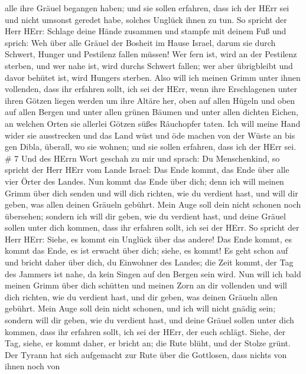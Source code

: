 alle ihre Gräuel begangen haben;  und sie sollen erfahren,
dass ich der HErr sei und nicht umsonst geredet habe, solches Unglück
ihnen zu tun.  So spricht der Herr HErr: Schlage deine
Hände zusammen und stampfe mit deinem Fuß und sprich: Weh über alle
Gräuel der Bosheit im Hause Israel, darum sie durch Schwert, Hunger und
Pestilenz fallen müssen!  Wer fern ist, wird an der
Pestilenz sterben, und wer nahe ist, wird durchs Schwert fallen; wer
aber übrigbleibt und davor behütet ist, wird Hungers sterben. Also will
ich meinen Grimm unter ihnen vollenden,  dass ihr erfahren
sollt, ich sei der HErr, wenn ihre Erschlagenen unter ihren Götzen
liegen werden um ihre Altäre her, oben auf allen Hügeln und oben auf
allen Bergen und unter allen grünen Bäumen und unter allen dichten
Eichen, an welchen Orten sie allerlei Götzen süßes Räuchopfer taten.
 Ich will meine Hand wider sie ausstrecken und das Land
wüst und öde machen von der Wüste an bis gen Dibla, überall, wo sie
wohnen; und sie sollen erfahren, dass ich der HErr sei. \# 7
 Und des HErrn Wort geschah zu mir und sprach: 
Du Menschenkind, so spricht der Herr HErr vom Lande Israel: Das Ende
kommt, das Ende über alle vier Örter des Landes.  Nun kommt
das Ende über dich; denn ich will meinen Grimm über dich senden und will
dich richten, wie du verdient hast, und will dir geben, was allen deinen
Gräueln gebührt.  Mein Auge soll dein nicht schonen noch
übersehen; sondern ich will dir geben, wie du verdient hast, und deine
Gräuel sollen unter dich kommen, dass ihr erfahren sollt, ich sei der
HErr.  So spricht der Herr HErr: Siehe, es kommt ein Unglück
über das andere!  Das Ende kommt, es kommt das Ende, es ist
erwacht über dich; siehe, es kommt!  Es geht schon auf und
bricht daher über dich, du Einwohner des Landes; die Zeit kommt, der Tag
des Jammers ist nahe, da kein Singen auf den Bergen sein wird.
 Nun will ich bald meinen Grimm über dich schütten und
meinen Zorn an dir vollenden und will dich richten, wie du verdient
hast, und dir geben, was deinen Gräueln allen gebührt.  Mein
Auge soll dein nicht schonen, und ich will nicht gnädig sein; sondern
will dir geben, wie du verdient hast, und deine Gräuel sollen unter dich
kommen, dass ihr erfahren sollt, ich sei der HErr, der euch schlägt.
 Siehe, der Tag, siehe, er kommt daher, er bricht an; die
Rute blüht, und der Stolze grünt.  Der Tyrann hat sich
aufgemacht zur Rute über die Gottlosen, dass nichts von ihnen noch von
